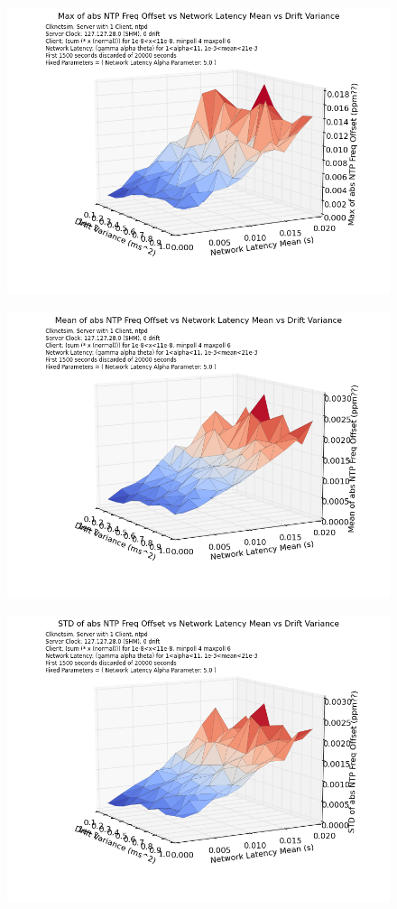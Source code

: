 \begin{figure}[h]
  \includegraphics[width=0.8\linewidth]{max_abs_freq-mean_latency-drift_var.png}
\end{figure}

\begin{figure}[h]
  \includegraphics[width=0.8\linewidth]{mean_abs_freq-mean_latency-drift_var.png}
\end{figure}

\begin{figure}[h]
  \includegraphics[width=0.8\linewidth]{stddev_abs_freq-mean_latency-drift_var.png}
\end{figure}

